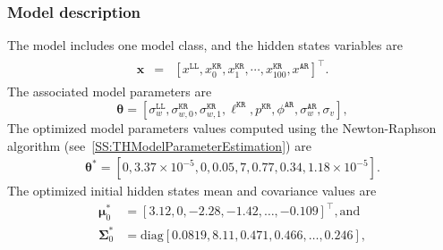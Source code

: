 \subsubsection{Model description}
\label{SS:ModelConstructionExampleTraffic}

The model includes one model class, and the hidden states variables are 
\begin{gather*}
\begin{array}{rcl}
\mathbf{x} &=& \left[x^{\mathtt{LL}}, x_{0}^{\mathtt{KR}}, x_{1}^{\mathtt{KR}},\cdots,x_{100}^{\mathtt{KR}}, x^{\mathtt{AR}}\right]^{\intercal}.
\end{array}
\end{gather*}
The associated model parameters are
\begin{equation}
\label{EQ:PTL}
\bm\theta = \left[\sigma^{\mathtt{LL}}_{w}, \sigma_{w,0}^{\mathtt{KR}}, \sigma_{w,1}^{\mathtt{KR}}, \ell^{\mathtt{KR}}, p^{\mathtt{KR}}, \phi^{\mathtt{AR}}, \sigma^{\mathtt{AR}}_{w}, \sigma_{v}\right],
\end{equation}
The optimized model parameters values computed using the Newton-Raphson algorithm (see~\ref{SS:THModelParameterEstimation}) are
\begin{gather*}
\bm\theta^{\text{*}}=[0 , 3.37\times10^{-5}, 0, 0.05, 7, 0.77, 0.34, 1.18\times10^{-5}].
\end{gather*}
The optimized initial hidden states mean and covariance values are 
\begin{align*}
\bm \mu^{*}_{0} & = [	 3.12  ,	0  ,   	-2.28  ,	-1.42 ,	\dots, -0.109]^{\intercal}, \text{and} \\
\bm\Sigma^{*}_{0} & = \text{diag}[   0.0819,	8.11,  0.471 ,	0.466, \dots, 0.246 ], 
 \end{align*}
